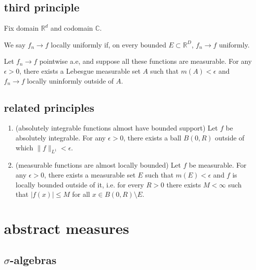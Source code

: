 \documentclass[12pt]{article}
\begin{document}

\subsection{third principle} %

Fix domain $\mathbb{R}^d$ and codomain $\mathbb{C}$. 

\begin{definition}
	We say $f_n\to f$ locally uniformly if, on every bounded $E\subset\mathbb{R}^D$, $f_n\to f$ uniformly.
\end{definition}

\begin{theorem}
	Let $f_n\to f$ pointwise a.e, and suppose all these functions are measurable. For any $\epsilon>0$, there exists a Lebesgue measurable set $A$ such that $m(A)<\epsilon$ and $f_n\to f$ locally uninformly outside of $A$. 
\end{theorem}


\subsection{related principles} %

\begin{enumerate}
	\item (absolutely integrable functions almost have bounded support) Let $f$ be absolutely integrable. For any $\epsilon>0$, there exists a ball $B(0,R)$ outside of which $\|f\|_{L^1}<\epsilon$.
	\item (measurable functions are almost locally bounded) Let $f$ be measurable. For any $\epsilon>0$, there exists a measurable set $E$ such that $m(E)<\epsilon$ and $f$ is locally bounded outside of it, i.e. for every $R>0$ there exists $M<\infty$ such that $|f(x)|\leq M$ for all $x\in B(0,R)\setminus E$.
\end{enumerate}



\section{abstract measures} %

\subsection{$\sigma$-algebras} %
\end{document}
